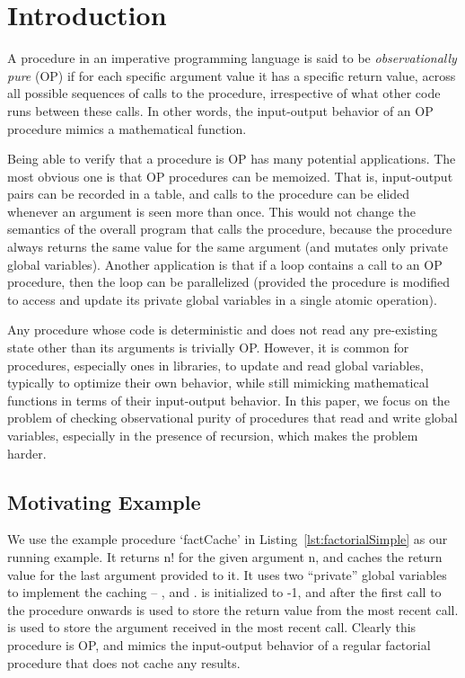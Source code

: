 \section{Introduction}

A procedure in an imperative programming language is said to be
\emph{observationally pure} (OP) if for each specific argument value it has
a specific return value, across all possible sequences of calls to the
procedure, irrespective of what other code runs between these calls.  In
other words, the input-output behavior of an OP procedure mimics a mathematical
function.

Being able to verify that a procedure is OP has many potential
applications. The most obvious one is that OP procedures can be
memoized. That is, input-output pairs can be recorded in a table, and calls
to the procedure can be elided whenever an argument is seen more than
once. This would not change the semantics of the overall program that calls
the procedure, because the procedure always returns the same value for the
same argument (and mutates only private global variables). Another
application is that if a loop contains a call to an OP procedure, then the
loop can be parallelized (provided the procedure is modified to access and
update its private global variables in a single atomic operation).


Any procedure whose code is deterministic and does not read any
pre-existing state other than its arguments is trivially OP.
However, it is common for procedures, especially ones in libraries,
to update and read global variables, typically to optimize their own behavior,
while still mimicking mathematical functions in terms of their input-output behavior.
In this paper, we focus on the problem of checking observational purity of
procedures that read and write global variables, especially in the presence of recursion,
which makes the problem harder.

\subsection{Motivating Example}
We use the example procedure `factCache' in
Listing~\ref{lst:factorialSimple}  as our running example. It
returns n! for the given argument n, and caches the return value for the
last argument provided to it. It uses two ``private'' global variables to
implement the caching -- , and .  is initialized to -1, and after
the first call to the procedure onwards is used to store the return value
from the most recent call.  is used to store the argument received in
the most recent call. Clearly this procedure is OP, and mimics the
input-output behavior of a regular factorial procedure that does not cache
any results. 

